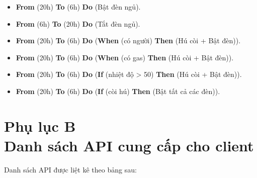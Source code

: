 \documentclass[12pt,a4paper,oneside]{extbook}
\begin{document}
\begin{itemize}[topsep=1mm,itemsep=-0.5mm]
\item \textbf{From} (20h) \textbf{To} (6h) \textbf{Do} (Bật đèn ngủ).
\item \textbf{From} (6h) \textbf{To} (20h) \textbf{Do} (Tắt đèn ngủ).
\item \textbf{From} (20h) \textbf{To} (6h) \textbf{Do} (\textbf{When} (có người) \textbf{Then} (Hú còi + Bật đèn)).
\item \textbf{From} (20h) \textbf{To} (6h) \textbf{Do} (\textbf{When} (có gas) \textbf{Then} (Hú còi + Bật đèn)).
\item \textbf{From} (20h) \textbf{To} (6h) \textbf{Do} (\textbf{If} (nhiệt độ > 50) \textbf{Then} (Hú còi + Bật đèn)).
\item \textbf{From} (20h) \textbf{To} (6h) \textbf{Do} (\textbf{If} (còi hú) \textbf{Then} (Bật tất cả các đèn)).
\vspace{1mm}
\end{itemize}

\thispagestyle{plain}
\pagestyle{plain}

\chapter*{Phụ lục B \\Danh sách API cung cấp cho client}

Danh sách API được liệt kê theo bảng sau:
\end{document}

